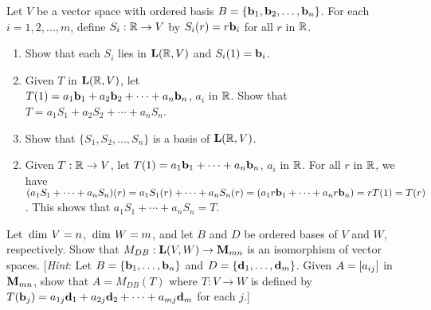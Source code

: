 \begin{multicols}{1}
\begin{ex}
Let $V$ be a vector space with ordered basis $B = \{\textbf{b}_{1}, \textbf{b}_{2}, \dots, \textbf{b}_{n}\}$. For each $i = 1, 2, \dots, m$, define $S_{i} : \mathbb{R} \to V$ by $S_{i}(r) = r\textbf{b}_{i}$ for all $r$ in $\mathbb{R}$.


\begin{enumerate}[label={\alph*.}]
\item Show that each $S_{i}$ lies in $\textbf{L}(\mathbb{R}, V)$ and $S_{i}(1) = \textbf{b}_{i}$.

\item Given $T$ in $\textbf{L}(\mathbb{R}, V)$, let \\ $T(1) = a_{1}\textbf{b}_{1} + a_{2}\textbf{b}_{2} + \cdots + a_{n}\textbf{b}_{n}$, $a_{i}$ in $\mathbb{R}$. Show that $T = a_{1}S_{1} + a_{2}S_{2} + \cdots + a_{n}S_{n}$.

\item Show that $\{S_{1}, S_{2}, \dots, S_{n}\}$ is a basis of $\textbf{L}(\mathbb{R}, V)$.

\end{enumerate}
\begin{sol}
\begin{enumerate}[label={\alph*.}]
\setcounter{enumi}{1}
\item Given $T : \mathbb{R} \to V$, let $T(1) = a_{1}\textbf{b}_{1} + \cdots + a_{n}\textbf{b}_{n}$, $a_{i}$ in $\mathbb{R}$. For all $r$ in $\mathbb{R}$, we have $(a_{1}S_{1} + \cdots + a_{n}S_{n})(r) = a_{1}S_{1}(r) + \cdots + a_{n}S_{n}(r) = (a_{1}r\textbf{b}_{1} + \cdots + a_{n}r\textbf{b}_{n}) = rT(1) = T(r)$. This shows that $a_{1}S_{1} + \cdots + a_{n}S_{n} = T$.

\end{enumerate}
\end{sol}
\end{ex}

\begin{ex} \label{ex:9_1_26}
Let $\thinspace\operatorname{dim \medspace}V = n$, $\thinspace\operatorname{dim \medspace}W = m$, and let $B$ and $D$ be ordered bases of $V$ and $W$, respectively. Show that $M_{DB} : \textbf{L}(V, W) \to \textbf{M}_{mn}$ is an isomorphism of vector spaces. [\textit{Hint}: Let $B = \{\textbf{b}_{1}, \dots, \textbf{b}_{n}\}$ and $D = \{\textbf{d}_{1}, \dots, \textbf{d}_{m}\}$. Given $A = \left[ a_{ij} \right]$ in $\textbf{M}_{mn}$, show that $A = M_{DB}(T)$ where $T : V \to W$ is defined by \\ $T(\textbf{b}_{j}) = a_{1j}\textbf{d}_{1} + a_{2j}\textbf{d}_{2} + \cdots + a_{mj}\textbf{d}_{m}$ for each $j$.]
\end{ex}


\end{multicols}
